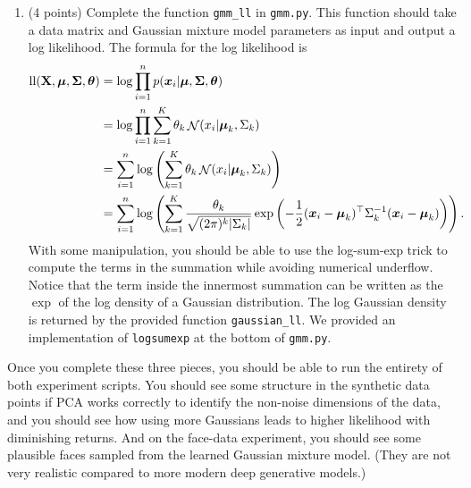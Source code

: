 \documentclass[10pt]{article}
\newcommand{\bx}{{\boldsymbol x}}
\newcommand{\bX}{\mathbf {X}}
\newcommand{\bmu}{{\boldsymbol \mu}}
\newcommand{\bSigma}{{\boldsymbol \Sigma}}
\newcommand{\btheta}{{\boldsymbol \theta}}
\DeclareMathOperator*{\normal}{{\cal N}}
\begin{document}
\begin{enumerate}
\item (4 points) Complete the function \texttt{gmm\_ll} in \texttt{gmm.py}. This function should take a data matrix and Gaussian mixture model parameters as input and output a log likelihood. The formula for the log likelihood is
\begin{equation}
\begin{aligned}
\mathrm{ll}(\bX, \bmu, \bSigma, \btheta) &= \log \prod_{i=1}^n p(\bx_i | \bmu, \bSigma, \btheta)\\
&= \log \prod_{i=1}^n \sum_{k = 1}^K \theta_k \normal(x_i | \bmu_k, \Sigma_k)\\
&=  \sum_{i=1}^n \log \left(\sum_{k = 1}^K \theta_k \normal(x_i | \bmu_k, \Sigma_k) \right)\\
&=  \sum_{i=1}^n \log \left(\sum_{k = 1}^K  \frac{\theta_k}{\sqrt{(2\pi)^k|\Sigma_k|}} \exp\left(- \frac{1}{2} (\bx_i - \bmu_k)^\top \Sigma_k^{-1} (\bx_i - \bmu_k)\right) \right).
\end{aligned}
\end{equation}
With some manipulation, you should be able to use the log-sum-exp trick to compute the terms in the summation while avoiding numerical underflow. Notice that the term inside the innermost summation can be written as the $\exp$ of the log density of a Gaussian distribution. The log Gaussian density is returned by the provided function \texttt{gaussian\_ll}.
We provided an implementation of \texttt{logsumexp} at the bottom of \texttt{gmm.py}.

\end{enumerate}

Once you complete these three pieces, you should be able to run the entirety of both experiment scripts. You should see some structure in the synthetic data points if PCA works correctly to identify the non-noise dimensions of the data, and you should see how using more Gaussians leads to higher likelihood with diminishing returns. And on the face-data experiment, you should see some plausible faces sampled from the learned Gaussian mixture model. (They are not very realistic compared to more modern deep generative models.)
\end{document}
